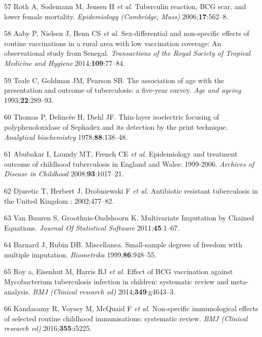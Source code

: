\documentclass[11pt,twoside]{bristolthesis}
\begin{document}
  \leavevmode\hypertarget{ref-Roth2006a}{}%
  57 Roth A, Sodemann M, Jensen H \emph{et al.} Tuberculin reaction, BCG scar, and lower female mortality. \emph{Epidemiology (Cambridge, Mass)} 2006;\textbf{17}:562--8.
  
  \leavevmode\hypertarget{ref-Aaby2014}{}%
  58 Aaby P, Nielsen J, Benn CS \emph{et al.} Sex-differential and non-specific effects of routine vaccinations in a rural area with low vaccination coverage: An observational study from Senegal. \emph{Transactions of the Royal Society of Tropical Medicine and Hygiene} 2014;\textbf{109}:77--84.
  
  \leavevmode\hypertarget{ref-Teale1993}{}%
  59 Teale C, Goldman JM, Pearson SB. The association of age with the presentation and outcome of tuberculosis: a five-year survey. \emph{Age and ageing} 1993;\textbf{22}:289--93.
  
  \leavevmode\hypertarget{ref-DCLG2011}{}%
  60 Thomas P, Delincée H, Diehl JF. Thin-layer isoelectric focusing of polyphenoloxidase of Sephadex and its detection by the print technique. \emph{Analytical biochemistry} 1978;\textbf{88}:138--48.
  
  \leavevmode\hypertarget{ref-Abubakar2008}{}%
  61 Abubakar I, Laundy MT, French CE \emph{et al.} Epidemiology and treatment outcome of childhood tuberculosis in England and Wales: 1999-2006. \emph{Archives of Disease in Childhood} 2008;\textbf{93}:1017--21.
  
  \leavevmode\hypertarget{ref-Djuretic2002}{}%
  62 Djuretic T, Herbert J, Drobniewski F \emph{et al.} Antibiotic resistant tuberculosis in the United Kingdom : 2002;477--82.
  
  \leavevmode\hypertarget{ref-VanBuuren2011}{}%
  63 Van Buuren S, Groothuis-Oudshoorn K. Multivariate Imputation by Chained Equations. \emph{Journal Of Statistical Software} 2011;\textbf{45}:1--67.
  
  \leavevmode\hypertarget{ref-Barnard1999}{}%
  64 Barnard J, Rubin DB. Miscellanea. Small-sample degrees of freedom with multiple imputation. \emph{Biometrika} 1999;\textbf{86}:948--55.
  
  \leavevmode\hypertarget{ref-Roy2014b}{}%
  65 Roy a, Eisenhut M, Harris RJ \emph{et al.} Effect of BCG vaccination against Mycobacterium tuberculosis infection in children: systematic review and meta-analysis. \emph{BMJ (Clinical research ed)} 2014;\textbf{349}:g4643--3.
  
  \leavevmode\hypertarget{ref-Kandasamy2016}{}%
  66 Kandasamy R, Voysey M, McQuaid F \emph{et al.} Non-specific immunological effects of selected routine childhood immunisations: systematic review. \emph{BMJ (Clinical research ed)} 2016;\textbf{355}:i5225.
  
\end{document}
